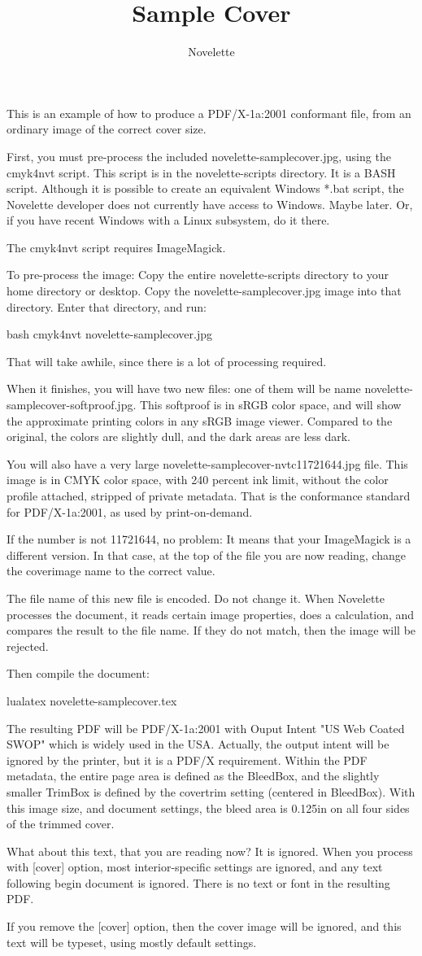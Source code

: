 \documentclass[cover]{novelette} %
\title{Sample Cover}
\author{Novelette}
\begin{document}
This is an example of how to produce a PDF/X-1a:2001 conformant file,
from an ordinary image of the correct cover size.

First, you must pre-process the included novelette-samplecover.jpg,
using the cmyk4nvt script. This script is in the novelette-scripts
directory. It is a BASH script. Although it is possible to create
an equivalent Windows *.bat script, the Novelette developer does not
currently have access to Windows. Maybe later. Or, if you have recent
Windows with a Linux subsystem, do it there.

The cmyk4nvt script requires ImageMagick.

To pre-process the image: Copy the entire novelette-scripts directory to
your home directory or desktop. Copy the novelette-samplecover.jpg image
into that directory. Enter that directory, and run:

bash cmyk4nvt novelette-samplecover.jpg

That will take awhile, since there is a lot of processing required.

When it finishes, you will have two new files: one of them will be
name novelette-samplecover-softproof.jpg. This softproof is in sRGB
color space, and will show the approximate printing colors in any
sRGB image viewer. Compared to the original, the colors are slightly dull,
and the dark areas are less dark.

You will also have a very large novelette-samplecover-nvtc11721644.jpg file.
This image is in CMYK color space, with 240 percent ink limit, without
the color profile attached, stripped of private metadata. That is the
conformance standard for PDF/X-1a:2001, as used by print-on-demand.

If the number is not 11721644, no problem: It means that your ImageMagick
is a different version. In that case, at the top of the file you are
now reading, change the coverimage name to the correct value.

The file name of this new file is encoded. Do not change it. When Novelette
processes the document, it reads certain image properties, does a calculation,
and compares the result to the file name. If they do not match, then
the image will be rejected.

Then compile the document:

lualatex novelette-samplecover.tex

The resulting PDF will be PDF/X-1a:2001 with Ouput Intent "US Web Coated SWOP"
which is widely used in the USA. Actually, the output intent will be ignored
by the printer, but it is a PDF/X requirement. Within the PDF metadata,
the entire page area is defined as the BleedBox, and the slightly smaller
TrimBox is defined by the covertrim setting (centered in BleedBox).
With this image size, and document settings, the bleed area is 0.125in
on all four sides of the trimmed cover.

What about this text, that you are reading now? It is ignored. When you
process with [cover] option, most interior-specific settings are ignored,
and any text following begin document is ignored. There is no text or font
in the resulting PDF.

If you remove the [cover] option, then the cover image will be ignored,
and this text will be typeset, using mostly default settings.
\end{document}

